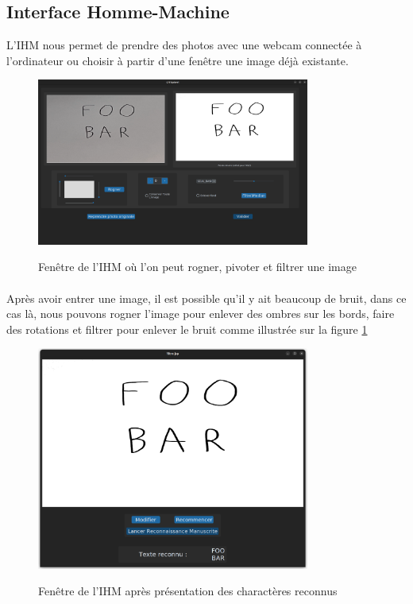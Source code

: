 \documentclass[a4paper]{article}
\begin{document}
		\subsection{Interface Homme-Machine}
			L'IHM nous permet de prendre des photos avec une webcam connectée à l'ordinateur ou choisir à partir d'une fenêtre une image déjà existante. 
			\begin{figure}[H]
				\caption{Fenêtre de l'IHM où l'on peut rogner, pivoter et filtrer une image}
				\includegraphics[width=0.8\textwidth]{modif.png}
				\centering
				\label{fig:modif}
			\end{figure}
			\paragraph{}
				Après avoir entrer une image, il est possible qu'il y ait beaucoup de bruit, dans ce cas là, nous pouvons rogner l'image pour enlever des ombres sur les bords, faire des rotations et filtrer pour enlever le bruit comme illustrée sur la figure \ref{fig:modif}
			\begin{figure}[H]
				\caption{Fenêtre de l'IHM après présentation des charactères reconnus}
				\includegraphics[width=0.8\textwidth]{recon.png}
				\centering
				\label{fig:recon}
			\end{figure}
\end{document}
